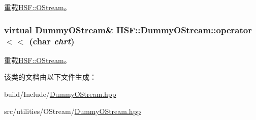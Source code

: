 重载\hyperlink{classHSF_1_1OStream_a1e3204a3bf16caf916d3e18c562a709c}{HSF::OStream}。\hypertarget{classHSF_1_1DummyOStream_a2388508ce3a9278f7d0aa4ccfd56f432}{
\subsubsection[{operator$<$$<$}]{\setlength{\rightskip}{0pt plus 5cm}virtual {\bf DummyOStream}\& HSF::DummyOStream::operator$<$$<$ (char {\em chrt})}}
\label{classHSF_1_1DummyOStream_a2388508ce3a9278f7d0aa4ccfd56f432}


重载\hyperlink{classHSF_1_1OStream_ad542e8e0a3da490c9df517819fe174ca}{HSF::OStream}。

该类的文档由以下文件生成：\begin{DoxyCompactItemize}
\item 
build/Include/\hyperlink{build_2Include_2DummyOStream_8hpp}{DummyOStream.hpp}\item 
src/utilities/OStream/\hyperlink{src_2utilities_2OStream_2DummyOStream_8hpp}{DummyOStream.hpp}\end{DoxyCompactItemize}
